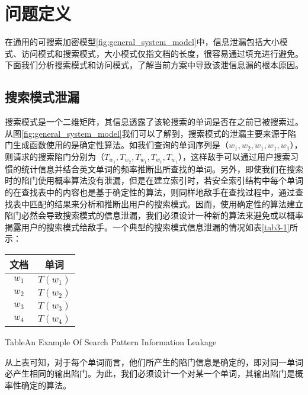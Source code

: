 \section{问题定义}
\label{sec:searchpattern_problem_definition}

在通用的可搜索加密模型\ref{fig:general_system_model}中，信息泄漏包括大小模式、访问模式和搜索模式，大小模式仅指文档的长度，很容易通过填充进行避免。下面我们分析搜索模式和访问模式，了解当前方案中导致该泄信息漏的根本原因。

\subsection{搜索模式泄漏}
\label{sec:searchpattern_problem_definition_search_pattern}
搜索模式是一个二维矩阵，其信息透露了该轮搜索的单词是否在之前已被搜索过。从图\ref{fig:general_system_model}我们可以了解到，搜索模式的泄漏主要来源于陷门生成函数使用的是确定性算法。如我们查询的单词序列是（$w_1, w_2, w_1, w_1, w_1$），则请求的搜索陷门分别为（$T_{w_1}, T_{w_2}, T_{w_1}, T_{w_1}, T_{w_1}$），这样敌手可以通过用户搜索习惯的统计信息并结合英文单词的频率推断出所查找的单词。另外，即使我们在搜索时的陷门使用概率算法没有泄漏，但是在建立索引时，若安全索引结构中每个单词的在查找表中的内容也是基于确定性的算法，则同样地敌手在查找过程中，通过查找表中匹配的结果来分析和推断出用户的搜索模式。因而，使用确定性的算法建立陷门必然会导致搜索模式的信息泄漏，我们必须设计一种新的算法来避免或以概率揭露用户的搜索模式给敌手。一个典型的搜索模式信息泄漏的情况如表\ref{tab3-1}所示：
 \begin{table}[h]
  \centering
  \begin{tabular}[t]{|c|c|}
  \hline
    文档 &       单词 \\
    \hline
    $w_1$ & $T(w_1)$ \\
    \hline
    $w_2$ & $T(w_2)$ \\
    \hline
    $w_3$ & $T(w_3)$ \\
    \hline
    $w_4$ & $T(w_4)$  \\
    \hline
  \end{tabular}
  {Table}{An Example Of Search Pattern Information Leakage}
  \end{table}

从上表可知，对于每个单词而言，他们所产生的陷门信息是确定的，即对同一单词必产生相同的输出陷门。为此，我们必须设计一个对某一个单词，其输出陷门是概率性确定的算法。



